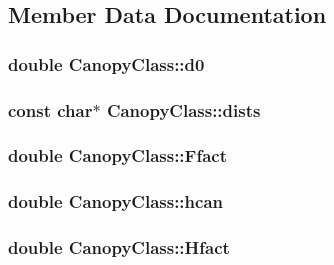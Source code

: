 \subsection{Member Data Documentation}
\subsubsection[{\texorpdfstring{d0}{d0}}]{\setlength{\rightskip}{0pt plus 5cm}double Canopy\+Class\+::d0}\hypertarget{class_canopy_class_aad893ee243ac053d329bdfe7efc8147b}{}\label{class_canopy_class_aad893ee243ac053d329bdfe7efc8147b}
\subsubsection[{\texorpdfstring{dists}{dists}}]{\setlength{\rightskip}{0pt plus 5cm}const char$\ast$ Canopy\+Class\+::dists}\hypertarget{class_canopy_class_af49142f889313f3c4a9a967c74863aca}{}\label{class_canopy_class_af49142f889313f3c4a9a967c74863aca}
\subsubsection[{\texorpdfstring{Ffact}{Ffact}}]{\setlength{\rightskip}{0pt plus 5cm}double Canopy\+Class\+::\+Ffact}\hypertarget{class_canopy_class_a6790f73d08cd1b7818042fb011ff1bfb}{}\label{class_canopy_class_a6790f73d08cd1b7818042fb011ff1bfb}
\subsubsection[{\texorpdfstring{hcan}{hcan}}]{\setlength{\rightskip}{0pt plus 5cm}double Canopy\+Class\+::hcan}\hypertarget{class_canopy_class_a2d918ca5155f44cc7bf883d8650cbd74}{}\label{class_canopy_class_a2d918ca5155f44cc7bf883d8650cbd74}
\subsubsection[{\texorpdfstring{Hfact}{Hfact}}]{\setlength{\rightskip}{0pt plus 5cm}double Canopy\+Class\+::\+Hfact}\hypertarget{class_canopy_class_a89b02239c0afeb67eb074118f729fafb}{}\label{class_canopy_class_a89b02239c0afeb67eb074118f729fafb}
